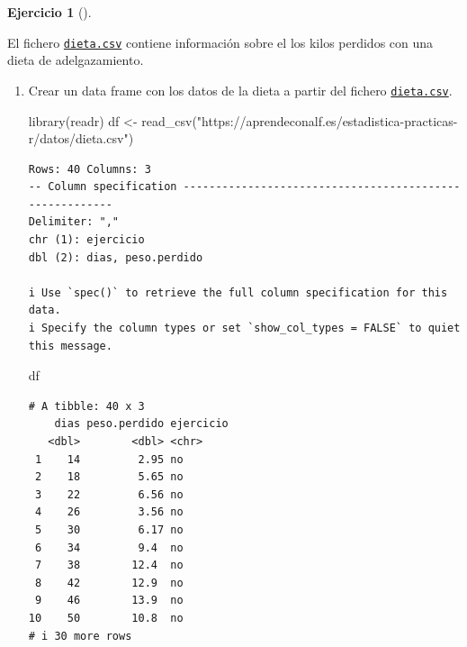 \documentclass[
  a4paper,
]{scrreport}
\newenvironment{Shaded}{\begin{snugshade}}{\end{snugshade}}
\newcommand{\FunctionTok}[1]{\textcolor[rgb]{0.28,0.35,0.67}{#1}}
\newcommand{\NormalTok}[1]{\textcolor[rgb]{0.00,0.23,0.31}{#1}}
\newcommand{\OtherTok}[1]{\textcolor[rgb]{0.00,0.23,0.31}{#1}}
\newcommand{\StringTok}[1]{\textcolor[rgb]{0.13,0.47,0.30}{#1}}
\theoremstyle{definition}
\newtheorem{exercise}{Ejercicio}[chapter]
\theoremstyle{remark}
\begin{document}
\begin{exercise}[]\protect\hypertarget{exr-regresion-dieta}{}\label{exr-regresion-dieta}

El fichero \href{datos/dieta.csv}{\texttt{dieta.csv}} contiene
información sobre el los kilos perdidos con una dieta de adelgazamiento.

\begin{enumerate}
\def\labelenumi{\alph{enumi}.}
\item
  Crear un data frame con los datos de la dieta a partir del fichero
  \href{https://aprendeconalf.es/estadistica-practicas-r/datos/dieta.csv}{\texttt{dieta.csv}}.

  \begin{tcolorbox}[enhanced jigsaw, breakable, opacityback=0, colbacktitle=quarto-callout-tip-color!10!white, colframe=quarto-callout-tip-color-frame, left=2mm, titlerule=0mm, coltitle=black, colback=white, bottomtitle=1mm, toptitle=1mm, opacitybacktitle=0.6, title=\textcolor{quarto-callout-tip-color}{\faLightbulb}\hspace{0.5em}{Solución}, leftrule=.75mm, bottomrule=.15mm, toprule=.15mm, rightrule=.15mm, arc=.35mm]

\begin{Shaded}
\begin{Highlighting}[]
\FunctionTok{library}\NormalTok{(readr)}
\NormalTok{df }\OtherTok{\textless{}{-}} \FunctionTok{read\_csv}\NormalTok{(}\StringTok{"https://aprendeconalf.es/estadistica{-}practicas{-}r/datos/dieta.csv"}\NormalTok{)}
\end{Highlighting}
\end{Shaded}

\begin{verbatim}
Rows: 40 Columns: 3
-- Column specification --------------------------------------------------------
Delimiter: ","
chr (1): ejercicio
dbl (2): dias, peso.perdido

i Use `spec()` to retrieve the full column specification for this data.
i Specify the column types or set `show_col_types = FALSE` to quiet this message.
\end{verbatim}

\begin{Shaded}
\begin{Highlighting}[]
\NormalTok{df}
\end{Highlighting}
\end{Shaded}

\begin{verbatim}
# A tibble: 40 x 3
    dias peso.perdido ejercicio
   <dbl>        <dbl> <chr>    
 1    14         2.95 no       
 2    18         5.65 no       
 3    22         6.56 no       
 4    26         3.56 no       
 5    30         6.17 no       
 6    34         9.4  no       
 7    38        12.4  no       
 8    42        12.9  no       
 9    46        13.9  no       
10    50        10.8  no       
# i 30 more rows
\end{verbatim}


\end{tcolorbox}
\end{enumerate}
\end{exercise}
\end{document}
